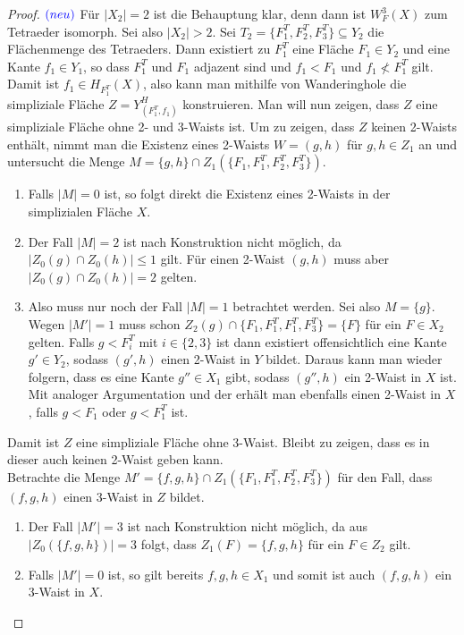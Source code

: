 \documentclass[12pt,titlepage]{article}
\begin{document}
\begin{proof} $\textcolor{blue}{(neu)}$
  Für $\vert X_2 \vert =2$ ist die Behauptung klar, denn dann ist $W^3_F(X)$ zum Tetraeder isomorph. Sei also $\vert X_2 \vert >2$. Sei $T_2=\{F_1^T,F_2^T,F_3^T\} \subseteq Y_2$ die Flächenmenge des Tetraeders. Dann existiert zu $F_1^T$ eine Fläche $F_1 \in Y_2$ und eine Kante $f_1 \in Y_1$, so dass  $F_1^T$ und $F_1$ adjazent sind und $f_1<F_1$ und $f_1 \nless F_1^T$ gilt. Damit ist $f_1 \in H_{F_1^T}(X)$, also kann man mithilfe von Wanderinghole die simpliziale Fläche $Z=Y^H_{(F_1^T,f_1)}$ konstruieren. Man will nun zeigen, dass $Z$ eine simpliziale Fläche ohne 2- und 3-Waists ist. Um zu zeigen, dass $Z$ keinen 2-Waists enthält, nimmt man die Existenz eines 2-Waists $W=(g,h)$ für $g,h\in Z_1$ an und untersucht die Menge $M=\{g,h\} \cap Z_1(\{F_1,F_1^T,F_2^T,F_3^T\})$.
  \begin{enumerate}
  \item Falls $\vert M \vert=0$ ist, so folgt direkt die Existenz eines 2-Waists in der simplizialen Fläche $X$. 
  \item Der Fall $\vert M\vert=2$ ist nach Konstruktion nicht möglich, da $\vert Z_0(g) \cap Z_0(h) \vert \leq 1$ gilt. Für einen 2-Waist $(g,h)$ muss aber $\vert Z_0(g) \cap Z_0(h) \vert=2$ gelten.
  \item Also muss nur noch der Fall $\vert M \vert=1$ betrachtet werden. 
  Sei also $M=\{g\}$. Wegen $\vert M' \vert=1$ muss schon $Z_2(g) \cap \{F_1,F_1^T,F_1^T,F_3^T\}=\{F\}$ für ein $F \in X_2$ gelten.
   Falls $g<F_i^T$ mit $i\in \{2,3\}$ ist dann existiert offensichtlich eine Kante $g'\in Y_2$, sodass $(g' ,h)$ einen 2-Waist in $Y$ bildet. 
   Daraus kann man wieder folgern, dass es eine Kante  $g''\in X_1$ gibt, sodass $(g'',h)$ ein 2-Waist in $X$ ist. Mit analoger Argumentation und der  erhält man ebenfalls einen 2-Waist in $X$, falls $g<F_1$ oder $g<F_1^T$ ist.  \end{enumerate}
  Damit ist $Z$ eine simpliziale Fläche ohne 3-Waist. Bleibt zu zeigen, dass es in dieser auch keinen 2-Waist geben kann.\\
  Betrachte die Menge $M'=\{f,g,h\} \cap Z_1(\{F_1,F_1^T,F_2^T,F_3^T\})$ für den Fall, dass $(f,g,h)$ einen 3-Waist in $Z$ bildet.
  \begin{enumerate}
  \item Der Fall $\vert M'\vert =3$ ist nach Konstruktion nicht möglich, da aus $\vert Z_0(\{f,g,h\})\vert=3$ folgt, dass $Z_1(F)=\{f,g,h\}$ für ein  $F\in Z_2$ gilt. 
  \item Falls $\vert M'\vert =0 $ ist, so gilt bereits $f,g,h \in X_1$ und somit ist auch $(f,g,h)$ ein 3-Waist in $X$.

\end{enumerate}
\end{proof}
\end{document}
